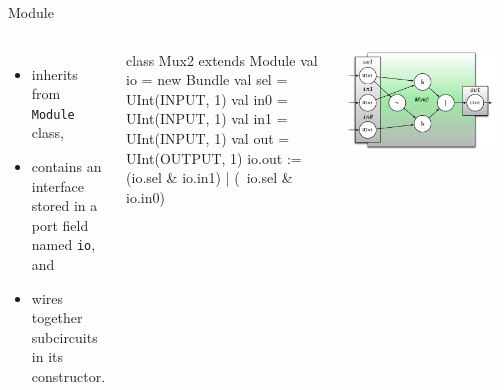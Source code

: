 \documentclass[xcolor=pdflatex,dvipsnames,table]{beamer}
\begin{document}
\begin{frame}[fragile]{Module}

\begin{columns}

\begin{itemize}
\item inherits from \verb+Module+ class,
\item contains an interface stored in a port field named \verb+io+, and
\item wires together subcircuits in its constructor.
\end{itemize}

\begin{scala}
class Mux2 extends Module {
  val io = new Bundle{
    val sel = UInt(INPUT, 1)
    val in0 = UInt(INPUT, 1)
    val in1 = UInt(INPUT, 1)
    val out = UInt(OUTPUT, 1)
  }
  io.out := (io.sel & io.in1) | 
            (~io.sel & io.in0)
}
\end{scala}


\begin{center}
\includegraphics[width=0.9\textwidth]{figs/mux2-component.pdf} 
\end{center}

\end{columns}

\end{frame}
\end{document}
